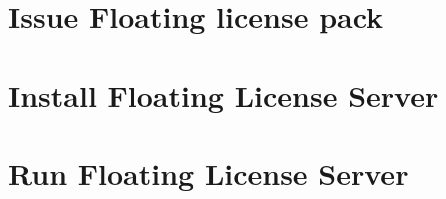 \documentclass[12pt]{report}
\begin{document}
\chapter*{Issue Floating license pack} \label{ch:issue-flp}

\chapter*{Install Floating License Server} \label{ch:install-fls}

\chapter*{Run Floating License Server} \label{ch:run-fls}
\end{document}
